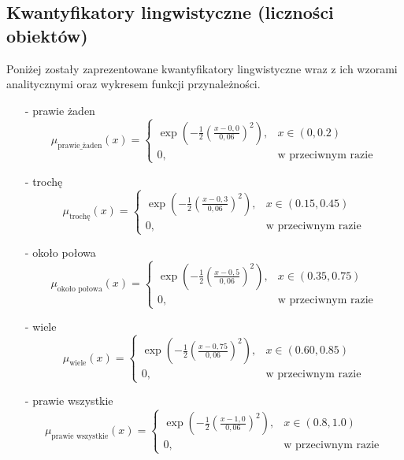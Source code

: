 \documentclass{article}
\begin{document}
\subsection{Kwantyfikatory lingwistyczne (liczności obiektów)}
Poniżej zostały zaprezentowane kwantyfikatory lingwistyczne wraz z ich wzorami analitycznymi oraz wykresem funkcji przynależności.
\begin{itemize}
    \item[-] prawie żaden
        \begin{equation}
            \mu_{\text{prawie\_żaden}}(x) =
        \begin{cases}
        \exp\left( -\frac{1}{2} \left( \frac{x - 0{,}0}{0,06} \right)^2 \right), & x \in (0, 0.2) \\
        0, & \text{w przeciwnym razie}
        \end{cases}
        \end{equation}
    \item[-] trochę
        \begin{equation}
            \mu_{\text{trochę}}(x) =
        \begin{cases}
       \exp\left( -\frac{1}{2} \left( \frac{x - 0{,}3}{0,06} \right)^2 \right), &  x \in (0.15, 0.45) \\
        0, & \text{w przeciwnym razie}
\end{cases}
        \end{equation}
    \item[-] około połowa
        \begin{equation}
        \mu_{\text{około połowa}}(x) =
        \begin{cases}
        \exp\left( -\frac{1}{2} \left( \frac{x - 0{,}5}{0,06} \right)^2 \right), & x \in (0.35, 0.75) \\
        0, & \text{w przeciwnym razie}
\end{cases}
        \end{equation}
    \item[-] wiele
        \begin{equation}
            \mu_{\text{wiele}}(x) =
            \begin{cases}
            \exp\left( -\frac{1}{2} \left( \frac{x - 0{,}75}{0,06} \right)^2 \right), & x \in (0.60, 0.85) \\
            0, & \text{w przeciwnym razie}
            \end{cases}
        \end{equation}
    \item[-] prawie wszystkie
        \begin{equation}
            \mu_{\text{prawie wszystkie}}(x) =
            \begin{cases}
            \exp\left( -\frac{1}{2} \left( \frac{x - 1{,}0}{0,06} \right)^2 \right), &  x \in (0.8, 1.0) \\
            0, & \text{w przeciwnym razie}
            \end{cases}
        \end{equation}
\end{itemize}
\end{document}
